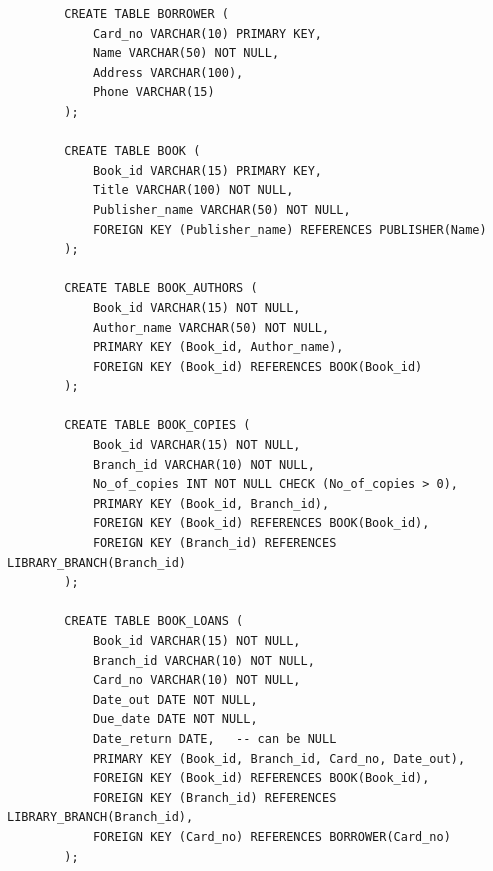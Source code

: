 \documentclass[12pt,a4paper]{article}
\begin{document}
\begin{enumerate}
\begin{enumerate}
\begin{verbatim}
        CREATE TABLE BORROWER (
            Card_no VARCHAR(10) PRIMARY KEY,
            Name VARCHAR(50) NOT NULL,
            Address VARCHAR(100),
            Phone VARCHAR(15) 
        );

        CREATE TABLE BOOK (
            Book_id VARCHAR(15) PRIMARY KEY,
            Title VARCHAR(100) NOT NULL,
            Publisher_name VARCHAR(50) NOT NULL,
            FOREIGN KEY (Publisher_name) REFERENCES PUBLISHER(Name)
        );

        CREATE TABLE BOOK_AUTHORS (
            Book_id VARCHAR(15) NOT NULL,
            Author_name VARCHAR(50) NOT NULL,
            PRIMARY KEY (Book_id, Author_name),
            FOREIGN KEY (Book_id) REFERENCES BOOK(Book_id)
        );

        CREATE TABLE BOOK_COPIES (
            Book_id VARCHAR(15) NOT NULL,
            Branch_id VARCHAR(10) NOT NULL,
            No_of_copies INT NOT NULL CHECK (No_of_copies > 0),
            PRIMARY KEY (Book_id, Branch_id),
            FOREIGN KEY (Book_id) REFERENCES BOOK(Book_id),
            FOREIGN KEY (Branch_id) REFERENCES LIBRARY_BRANCH(Branch_id)
        );

        CREATE TABLE BOOK_LOANS (
            Book_id VARCHAR(15) NOT NULL,
            Branch_id VARCHAR(10) NOT NULL,
            Card_no VARCHAR(10) NOT NULL,
            Date_out DATE NOT NULL,
            Due_date DATE NOT NULL,
            Date_return DATE,   -- can be NULL
            PRIMARY KEY (Book_id, Branch_id, Card_no, Date_out),
            FOREIGN KEY (Book_id) REFERENCES BOOK(Book_id),
            FOREIGN KEY (Branch_id) REFERENCES LIBRARY_BRANCH(Branch_id),
            FOREIGN KEY (Card_no) REFERENCES BORROWER(Card_no)
        );
        \end{verbatim}
    \end{enumerate}
\end{enumerate}
\end{document}
